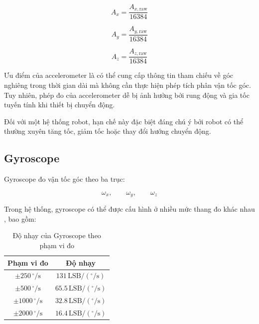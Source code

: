 \begin{equation}
A_x = \frac{A_{x,\text{raw}}}{16384}
\end{equation}

\begin{equation}
A_y = \frac{A_{y,\text{raw}}}{16384}
\end{equation}

\begin{equation}
A_z = \frac{A_{z,\text{raw}}}{16384}
\end{equation}

Ưu điểm của accelerometer là có thể cung cấp thông tin tham chiếu về góc nghiêng trong thời gian dài mà không cần thực hiện phép tích phân vận tốc góc. Tuy nhiên, phép đo của accelerometer dễ bị ảnh hưởng bởi rung động và gia tốc tuyến tính khi thiết bị chuyển động.

Đối với một hệ thống robot, hạn chế này đặc biệt đáng chú ý bởi robot có thể thường xuyên tăng tốc, giảm tốc hoặc thay đổi hướng chuyển động.

\subsection{Gyroscope}

Gyroscope đo vận tốc góc theo ba trục:

\begin{equation}
\omega_x,\qquad \omega_y,\qquad \omega_z
\end{equation}

Trong hệ thống, gyroscope có thể được cấu hình ở nhiều mức thang đo khác nhau \cite{mpu6050-register}, bao gồm:

\begin{table}[H]
\centering
\renewcommand{\arraystretch}{1.3}
\label{tab:gyro_sensitivity}
\begin{tabular}{|c|c|}
\hline
\textbf{Phạm vi đo} & \textbf{Độ nhạy} \\ \hline
$\pm 250\,^\circ/\text{s}$  & $131\,\text{LSB}/(^{\circ}/\text{s})$ \\ \hline
$\pm 500\,^\circ/\text{s}$  & $65.5\,\text{LSB}/(^{\circ}/\text{s})$ \\ \hline
$\pm 1000\,^\circ/\text{s}$ & $32.8\,\text{LSB}/(^{\circ}/\text{s})$ \\ \hline
$\pm 2000\,^\circ/\text{s}$ & $16.4\,\text{LSB}/(^{\circ}/\text{s})$ \\ \hline
\end{tabular}
\caption{Độ nhạy của Gyroscope theo phạm vi đo}
\end{table}


